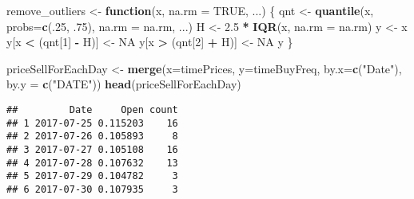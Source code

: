 \documentclass[]{article}
\newenvironment{Shaded}{\begin{snugshade}}{\end{snugshade}}
\newcommand{\KeywordTok}[1]{\textcolor[rgb]{0.13,0.29,0.53}{\textbf{#1}}}
\newcommand{\DataTypeTok}[1]{\textcolor[rgb]{0.13,0.29,0.53}{#1}}
\newcommand{\DecValTok}[1]{\textcolor[rgb]{0.00,0.00,0.81}{#1}}
\newcommand{\FloatTok}[1]{\textcolor[rgb]{0.00,0.00,0.81}{#1}}
\newcommand{\StringTok}[1]{\textcolor[rgb]{0.31,0.60,0.02}{#1}}
\newcommand{\OtherTok}[1]{\textcolor[rgb]{0.56,0.35,0.01}{#1}}
\newcommand{\ControlFlowTok}[1]{\textcolor[rgb]{0.13,0.29,0.53}{\textbf{#1}}}
\newcommand{\OperatorTok}[1]{\textcolor[rgb]{0.81,0.36,0.00}{\textbf{#1}}}
\newcommand{\NormalTok}[1]{#1}
\begin{document}
\begin{Shaded}
\begin{Highlighting}[]
\NormalTok{remove_outliers <-}\StringTok{ }\ControlFlowTok{function}\NormalTok{(x, }\DataTypeTok{na.rm =} \OtherTok{TRUE}\NormalTok{, ...) \{}
\NormalTok{  qnt <-}\StringTok{ }\KeywordTok{quantile}\NormalTok{(x, }\DataTypeTok{probs=}\KeywordTok{c}\NormalTok{(.}\DecValTok{25}\NormalTok{, .}\DecValTok{75}\NormalTok{), }\DataTypeTok{na.rm =}\NormalTok{ na.rm, ...)}
\NormalTok{  H <-}\StringTok{ }\FloatTok{2.5} \OperatorTok{*}\StringTok{ }\KeywordTok{IQR}\NormalTok{(x, }\DataTypeTok{na.rm =}\NormalTok{ na.rm)}
\NormalTok{  y <-}\StringTok{ }\NormalTok{x}
\NormalTok{  y[x }\OperatorTok{<}\StringTok{ }\NormalTok{(qnt[}\DecValTok{1}\NormalTok{] }\OperatorTok{-}\StringTok{ }\NormalTok{H)] <-}\StringTok{ }\OtherTok{NA}
\NormalTok{  y[x }\OperatorTok{>}\StringTok{ }\NormalTok{(qnt[}\DecValTok{2}\NormalTok{] }\OperatorTok{+}\StringTok{ }\NormalTok{H)] <-}\StringTok{ }\OtherTok{NA}
\NormalTok{  y}
\NormalTok{\}}

\NormalTok{priceSellForEachDay <-}\StringTok{ }\KeywordTok{merge}\NormalTok{(}\DataTypeTok{x=}\NormalTok{timePrices, }\DataTypeTok{y=}\NormalTok{timeBuyFreq, }\DataTypeTok{by.x=}\KeywordTok{c}\NormalTok{(}\StringTok{"Date"}\NormalTok{), }\DataTypeTok{by.y =} \KeywordTok{c}\NormalTok{(}\StringTok{"DATE"}\NormalTok{))}
\KeywordTok{head}\NormalTok{(priceSellForEachDay)}
\end{Highlighting}
\end{Shaded}

\begin{verbatim}
##         Date     Open count
## 1 2017-07-25 0.115203    16
## 2 2017-07-26 0.105893     8
## 3 2017-07-27 0.105108    16
## 4 2017-07-28 0.107632    13
## 5 2017-07-29 0.104782     3
## 6 2017-07-30 0.107935     3
\end{verbatim}

\begin{Shaded}
\end{Shaded}
\end{document}
